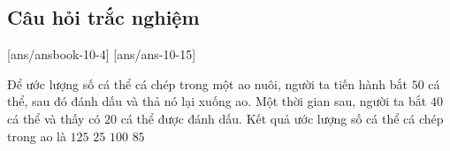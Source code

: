  
\subsection{Câu hỏi trắc nghiệm}
[ans/ansbook-10-4]
[ans/ans-10-15]
\begin{ex}
	Để ước lượng số cá thể cá chép trong một ao nuôi, người ta tiến hành bắt $50$ cá thể, sau đó đánh dấu và thả nó lại xuống ao. Một thời gian sau, người ta bắt $40$ cá thể và thấy có $20$ cá thể được đánh dấu. Kết quả ước lượng số cá thể cá chép trong ao là 
	\choice
	{$125 $}
	{$25 $}
	{\True $100 $}
	{$85 $}
\end{ex}

